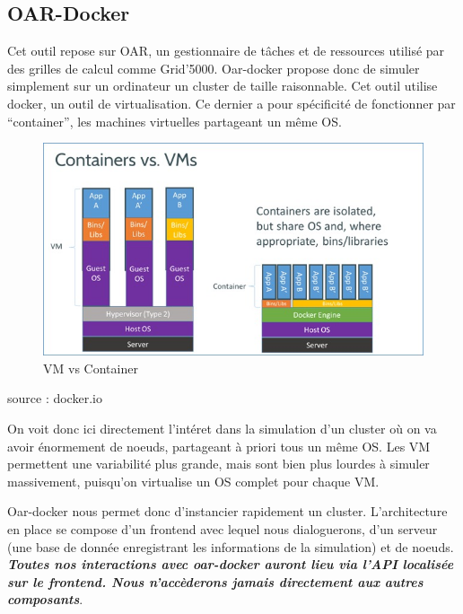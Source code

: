 \documentclass[a4paper,10pt]{article}
\begin{document}
\subsection{OAR-Docker}
Cet outil repose sur OAR, un gestionnaire de tâches et de ressources utilisé par des grilles de calcul comme Grid'5000.
Oar-docker propose donc de simuler simplement sur un ordinateur un cluster de taille raisonnable. Cet outil utilise docker, un outil de virtualisation.
Ce dernier a pour spécificité de fonctionner par ``container'', les machines virtuelles partageant un même OS.
\begin{figure}[h]
  \begin{center}
    \includegraphics[scale=0.3]{./docker.png}
   \caption{\label{docker} VM vs Container}
  \end{center}
\end{figure}

source : docker.io

On voit donc ici directement l'intéret dans la simulation d'un cluster où on va avoir énormement de noeuds, partageant à priori tous un même OS.
Les VM permettent une variabilité plus grande, mais sont bien plus lourdes à simuler massivement, puisqu'on virtualise un OS complet pour chaque VM.
\vspace{0.5cm}

Oar-docker nous permet donc d'instancier rapidement un cluster.
L'architecture en place se compose d'un frontend avec lequel nous dialoguerons, d'un serveur (une base de donnée enregistrant les informations de la simulation)
et de noeuds. \textbf{\textit{Toutes nos interactions avec oar-docker auront lieu via l'API localisée sur le frontend. Nous n'accèderons jamais directement aux autres composants}}.

\vspace{0.5cm}
\end{document}
